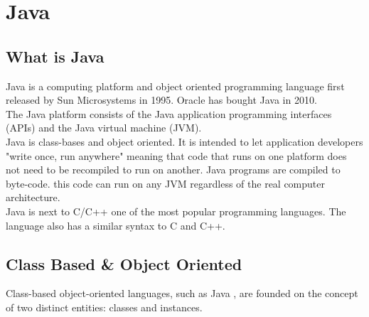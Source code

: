 

\section{Java}
\subsection{What is Java}
Java is a computing platform and object oriented programming language first released by Sun Microsystems in 1995. Oracle has bought Java in 2010.\cite{JavaWhat}
\\



The Java platform consists of the Java application programming interfaces (APIs) and the Java virtual machine (JVM).
\\



Java is class-bases and object oriented. It is intended to let application developers "write once, run anywhere" meaning that code that runs on one platform does not need to be recompiled to run on another. Java programs are compiled to byte-code. this code can run on any JVM regardless of the real computer architecture.\cite{javaWiki}
\\

Java is next to C/C++ one of the most popular programming languages.\cite{progLangPop} The language also has a similar syntax to C and C++.

\subsection{Class Based \& Object Oriented}
Class-based object-oriented languages, such as Java , are founded on the concept of two distinct entities: classes and instances.\cite{javaObjectClass} 

